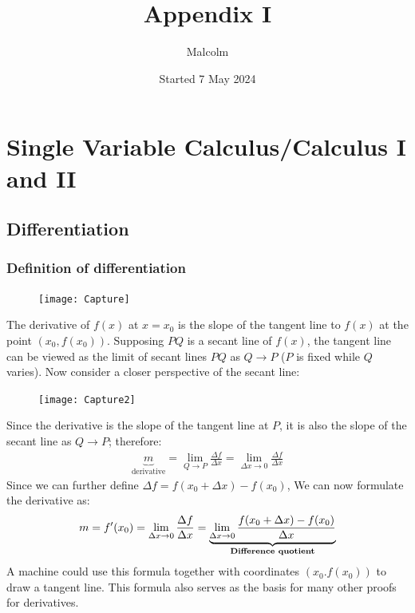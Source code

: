 \documentclass{report}
\title{Appendix I}
\date{Started 7 May 2024}
\author{Malcolm}
\begin{document}
\maketitle
\tableofcontents

\newpage
\appendix
\chapter{Single Variable Calculus/Calculus I and II}
\label{fundamentals}


\section{Differentiation}
\label{fundamentals:differentiation}

\subsection{Definition of differentiation} 
\label{fundamentals:differentiation:definition}
\begin{figure}[h]
\texttt{[image: Capture]}
\centering
\end{figure}
\noindent The derivative of $f(x)$ at $x=x_0$ is the slope of the tangent line to $f(x)$ at the
point $(x_0,f(x_0))$. Supposing $PQ$ is a secant line of $f(x)$, the tangent line can be viewed
as the limit of secant lines $PQ$ as $Q\to P$ ($P$ is fixed while $Q$ varies).
\newpage
\noindent Now consider a closer perspective of the secant line:
\begin{figure}[h]
\texttt{[image: Capture2]}
\centering
\end{figure}
Since the derivative is the slope of the tangent line at $P$, it is also the slope of the secant
line as $Q\to P$; therefore:
\begin{align*}
\underbrace{m}_{\text{derivative}}=\lim_{Q\to P}\frac{\Delta f}{\Delta x}
=\lim_{\Delta x\to 0}\frac{\Delta f}{\Delta x}
\end{align*}
Since we can further define $\Delta f=f(x_0+\Delta x)-f(x_0)$, We can now formulate the derivative as:
\begin{align*}
m=f'(x_0)=\lim_{\Delta x\to 0}\frac{\Delta f}{\Delta x}
=\underbrace{\lim_{\Delta x\to 0}\frac{f(x_0+\Delta x)-f(x_0)}{\Delta x}}
_{\text{\textbf{Difference quotient}}}
\end{align*}
A machine could use this formula together with coordinates $(x_0.f(x_0))$ to draw a tangent line.
This formula also serves as the basis for many other proofs for derivatives.
\newpage
\end{document}
